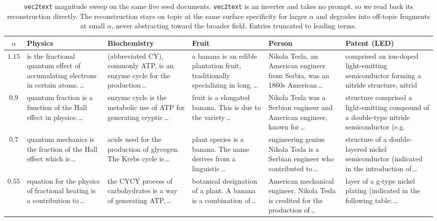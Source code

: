 \begin{table}[htbp]
\centering
\footnotesize
\setlength{\tabcolsep}{3pt}
\caption{\texttt{vec2text} magnitude sweep on the same five seed documents. \texttt{vec2text} is an inverter and takes no prompt, so we read back its reconstruction directly. The reconstruction stays on topic at the same surface specificity for larger $\alpha$ and degrades into off-topic fragments at small $\alpha$, never abstracting toward the broader field. Entries truncated to leading terms.}
\label{tab:radial-vec2text}
\begin{tabularx}{\linewidth}{@{}c *{5}{>{\raggedright\arraybackslash}X}@{}}
\toprule
$\alpha$ & \textbf{Physics} & \textbf{Biochemistry} & \textbf{Fruit} & \textbf{Person} & \textbf{Patent (LED)} \\
\midrule
$1.15$ & is the fractional quantum effect of accumulating electrons in certain atoms.\,\dots & (abbreviated CY), commonly ATP, is an enzyme cycle for the production\,\dots & a banana is an edible plantation fruit, traditionally specializing in long,\,\dots & Nikola Tesla, an American engineer from Serbia, was an 1860s American\,\dots & comprised an ion-doped light-emitting semiconductor forming a nitride structure, nitrid \\
$0.9$ & quantum fraction is a function of the Hall effect in physics:\,\dots & enzyme cycle is the metabolic use of ATP for generating cryptic\,\dots & fruit is a elongated banana. This is due to the variety\,\dots & Nikola Tesla was a Serbian engineer and American engineer, known for\,\dots & structure comprised a light-emitting compound of a double-type nitride semiconductor (e.g. \\
$0.7$ & quantum mechanics is the fraction of the Hall effect which is\,\dots & acids used for the production of glycogen. The Krebs cycle is\,\dots & plant species is a banana. The name derives from a linguistic\,\dots & engineering genius Nikola Tesla is a Serbian engineer who contributed to\,\dots & structure of a double-layered nickel semiconductor (indicated in the introduction of\,\dots \\
$0.55$ & equation for the physics of fractional heating is a contribution to\,\dots & the CYCY process of carbohydrates is a way of generating ATP,\,\dots & botanical designation of a plant. A banana is a combination of\,\dots & American mechanical engineer. Nikola Tesla is credited for the production of\,\dots & layer of a g-type nickel plating (indicated in the following table:\,\dots \\

\end{tabularx}
\end{table}
